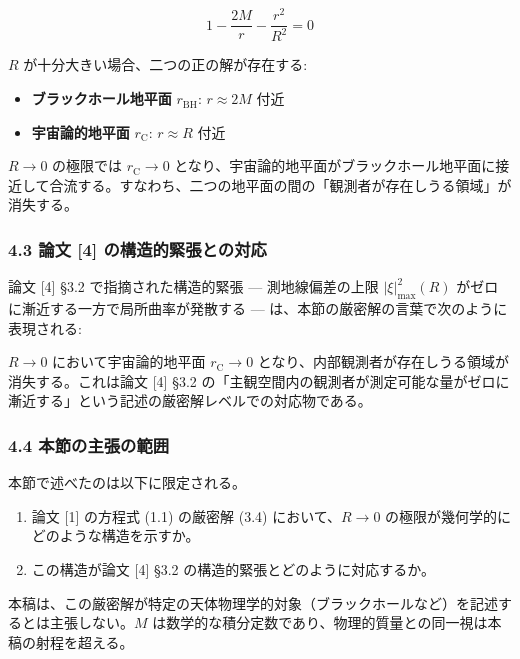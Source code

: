 \documentclass[a4paper,11pt]{ltjsarticle}
\theoremstyle{definition}
\providecommand{\tightlist}{\setlength{\itemsep}{0pt}\setlength{\parskip}{0pt}}
\begin{document}
\[1 - \frac{2M}{r} - \frac{r^2}{R^2} = 0 \tag{4.2}\]

\(R\) が十分大きい場合、二つの正の解が存在する:

\begin{itemize}
\tightlist
\item
  \textbf{ブラックホール地平面} \(r_{\mathrm{BH}}\): \(r \approx 2M\)
  付近
\item
  \textbf{宇宙論的地平面} \(r_{\mathrm{C}}\): \(r \approx R\) 付近
\end{itemize}

\(R \to 0\) の極限では \(r_{\mathrm{C}} \to 0\)
となり、宇宙論的地平面がブラックホール地平面に接近して合流する。すなわち、二つの地平面の間の「観測者が存在しうる領域」が消失する。

\subsubsection{4.3 論文 {[}4{]}
の構造的緊張との対応}\label{ux8ad6ux6587-4-ux306eux69cbux9020ux7684ux7dcaux5f35ux3068ux306eux5bfeux5fdc}

論文 {[}4{]} §3.2 で指摘された構造的緊張 --- 測地線偏差の上限
\(|\xi|^2_{\max}(R)\) がゼロに漸近する一方で局所曲率が発散する ---
は、本節の厳密解の言葉で次のように表現される:

\(R \to 0\) において宇宙論的地平面 \(r_{\mathrm{C}} \to 0\)
となり、内部観測者が存在しうる領域が消失する。これは論文 {[}4{]} §3.2
の「主観空間内の観測者が測定可能な量がゼロに漸近する」という記述の厳密解レベルでの対応物である。

\subsubsection{4.4
本節の主張の範囲}\label{ux672cux7bc0ux306eux4e3bux5f35ux306eux7bc4ux56f2}

本節で述べたのは以下に限定される。

\begin{enumerate}
\def\labelenumi{\arabic{enumi}.}
\tightlist
\item
  論文 {[}1{]} の方程式 (1.1) の厳密解 (3.4) において、\(R \to 0\)
  の極限が幾何学的にどのような構造を示すか。
\item
  この構造が論文 {[}4{]} §3.2 の構造的緊張とどのように対応するか。
\end{enumerate}

本稿は、この厳密解が特定の天体物理学的対象（ブラックホールなど）を記述するとは主張しない。\(M\)
は数学的な積分定数であり、物理的質量との同一視は本稿の射程を超える。
\end{document}
